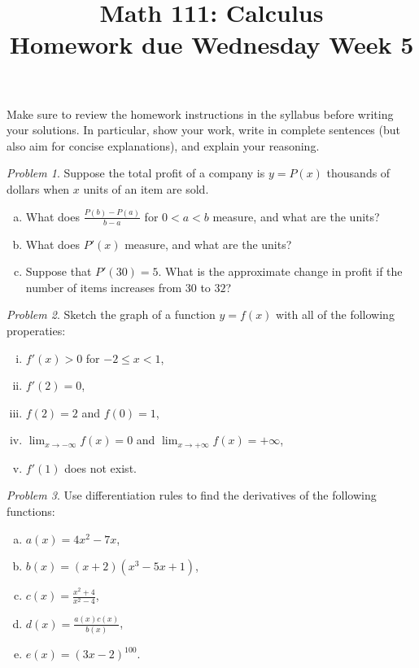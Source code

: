 \documentclass[11pt,twoside]{amsart}
\title{Math 111: Calculus\\ Homework due Wednesday Week 5}
\theoremstyle{plain}
\theoremstyle{remark}
\newtheorem{prob}{Problem}
\theoremstyle{definition}
\theoremstyle{definition}
\begin{document}
\maketitle

\noindent Make sure to review the homework instructions in the syllabus before writing your solutions. In particular, show your work, write in complete sentences (but also aim for concise explanations), and explain your reasoning.

\begin{prob}
Suppose the total profit of a company is $y=P(x)$ thousands of dollars when $x$ units of an item are sold.
\begin{enumerate}[(a)]
\item What does $\frac{P(b)-P(a)}{b-a}$ for $0<a<b$ measure, and what are the units?
\item What does $P'(x)$ measure, and what are the units?
\item Suppose that $P'(30)=5$. What is the approximate change in profit if the number of items increases from $30$ to $32$?
\end{enumerate}
\end{prob}

\begin{prob}
Sketch the graph of a function $y=f(x)$ with all of the following properaties:
\begin{enumerate}[(i)]
\item $f'(x)>0$ for $-2\le x<1$,
\item $f'(2)=0$,
\item $f(2)=2$ and $f(0)=1$,
\item $\lim_{x\to -\infty}f(x)=0$ and $\lim_{x\to +\infty}f(x) = +\infty$,
\item $f'(1)$ does not exist.
\end{enumerate}
\end{prob}

\begin{prob}
Use differentiation rules to find the derivatives of the following functions:
\begin{enumerate}[(a)]
\item $a(x) = 4x^2-7x$,
\item $b(x) = (x+2)(x^3-5x+1)$,
\item $c(x) = \frac{x^2+4}{x^2-4}$,
\item $d(x) = \frac{a(x)c(x)}{b(x)}$,
\item $e(x) = (3x-2)^{100}$.
\end{enumerate}
\end{prob}
\end{document}
